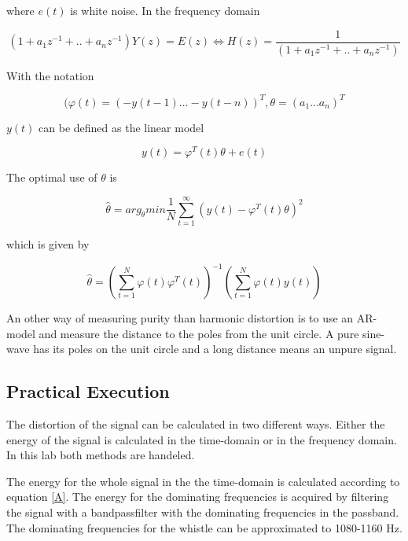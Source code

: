 \documentclass[12pt]{article}
\begin{document}
where $e(t)$ is white noise. In the frequency domain

\begin{equation}
\label{Hfreq}
(1+a_1z^{-1}+..+a_nz^{-1})Y(z)=E(z) \Leftrightarrow H(z) = \frac{1}{(1+a_1z^{-1}+..+a_nz^{-1})}
\end{equation}


With the notation

\begin{equation}
(\varphi(t) =(-y(t-1) ... -y(t-n))^T,\theta = (a_1 ... a_n)^T 
\end{equation}

$y(t)$ can be defined as the linear model

\begin{equation}
y(t)=\varphi^T(t)\theta+ e(t)
\end{equation}

The optimal use of $\theta$ is

\begin{equation}
\hat{\theta}=arg_{\theta}min \frac{1}{N}\sum_{t=1}^{\infty}(y(t)-\varphi^T(t)\theta)^2
\end{equation}

which is given by

\begin{equation}
\hat{\theta}=\left(\sum_{t=1}^N\varphi(t)\varphi^T(t)\right)^{-1}\left(\sum_{t=1}^N\varphi(t)y(t)\right)
\label{enwhis}
\end{equation}

An other way of measuring purity than harmonic distortion is to use an AR-model and measure the distance to the poles from the unit circle. A pure sine-wave has its poles on the unit circle and a long distance means an unpure signal.


\subsection{Practical Execution}
The distortion of the signal can be calculated in two different ways. Either the energy of the signal is calculated in the time-domain or in the frequency domain. In this lab both methods are handeled.

The energy for the whole signal in the the time-domain is calculated according to equation \ref{A}. The energy for the dominating frequencies is acquired by filtering the signal with a bandpassfilter with the dominating frequencies in the passband. The dominating frequencies for the whistle can be approximated to 1080-1160 Hz. 
\end{document}
